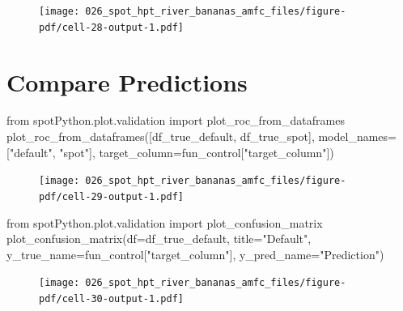 \documentclass[
  letterpaper,
  DIV=11,
  numbers=noendperiod]{scrreprt}
\newenvironment{Shaded}{\begin{snugshade}}{\end{snugshade}}
\newcommand{\ImportTok}[1]{\textcolor[rgb]{0.00,0.46,0.62}{#1}}
\newcommand{\NormalTok}[1]{\textcolor[rgb]{0.00,0.23,0.31}{#1}}
\newcommand{\OperatorTok}[1]{\textcolor[rgb]{0.37,0.37,0.37}{#1}}
\newcommand{\StringTok}[1]{\textcolor[rgb]{0.13,0.47,0.30}{#1}}
\begin{document}
\begin{figure}[H]

{\centering \texttt{[image: 026\_spot\_hpt\_river\_bananas\_amfc\_files/figure-pdf/cell-28-output-1.pdf]}

}

\end{figure}

\hypertarget{compare-predictions}{%
\section{Compare Predictions}\label{compare-predictions}}

\begin{Shaded}
\begin{Highlighting}[]
\ImportTok{from}\NormalTok{ spotPython.plot.validation }\ImportTok{import}\NormalTok{ plot\_roc\_from\_dataframes}
\NormalTok{plot\_roc\_from\_dataframes([df\_true\_default, df\_true\_spot], model\_names}\OperatorTok{=}\NormalTok{[}\StringTok{"default"}\NormalTok{, }\StringTok{"spot"}\NormalTok{], target\_column}\OperatorTok{=}\NormalTok{fun\_control[}\StringTok{"target\_column"}\NormalTok{])  }
\end{Highlighting}
\end{Shaded}

\begin{figure}[H]

{\centering \texttt{[image: 026\_spot\_hpt\_river\_bananas\_amfc\_files/figure-pdf/cell-29-output-1.pdf]}

}

\end{figure}

\begin{Shaded}
\begin{Highlighting}[]
\ImportTok{from}\NormalTok{ spotPython.plot.validation }\ImportTok{import}\NormalTok{ plot\_confusion\_matrix}
\NormalTok{plot\_confusion\_matrix(df}\OperatorTok{=}\NormalTok{df\_true\_default, title}\OperatorTok{=}\StringTok{"Default"}\NormalTok{, y\_true\_name}\OperatorTok{=}\NormalTok{fun\_control[}\StringTok{"target\_column"}\NormalTok{], y\_pred\_name}\OperatorTok{=}\StringTok{"Prediction"}\NormalTok{)}
\end{Highlighting}
\end{Shaded}

\begin{figure}[H]

{\centering \texttt{[image: 026\_spot\_hpt\_river\_bananas\_amfc\_files/figure-pdf/cell-30-output-1.pdf]}

}

\end{figure}
\end{document}
